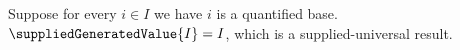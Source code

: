

\begin{definition}\label{supplied_generated_value}
    Suppose for every $i\in I$ we have $i$ is a quantified base.
    $\suppliedGeneratedValue{I}=I$, which is a supplied-universal result.
\end{definition}

